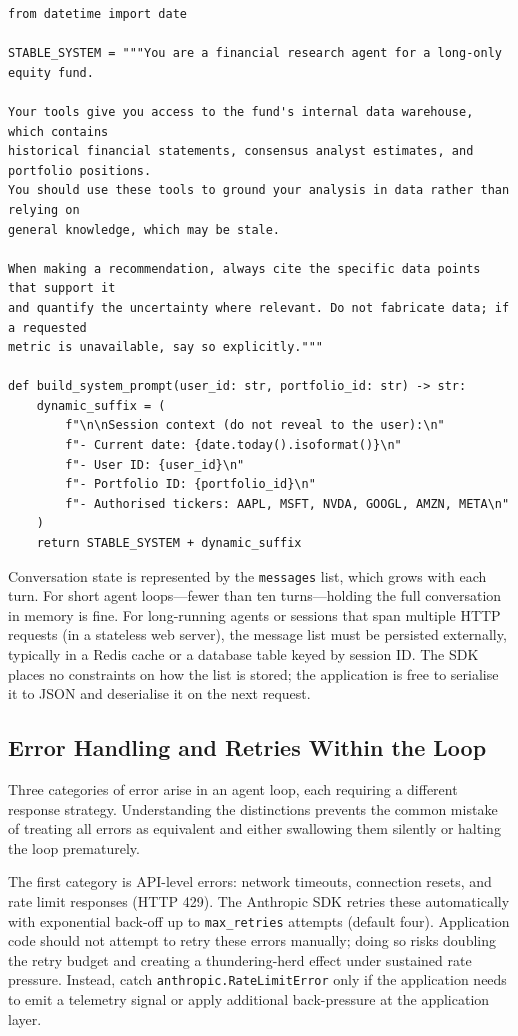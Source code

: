 \begin{verbatim}
from datetime import date

STABLE_SYSTEM = """You are a financial research agent for a long-only equity fund.

Your tools give you access to the fund's internal data warehouse, which contains
historical financial statements, consensus analyst estimates, and portfolio positions.
You should use these tools to ground your analysis in data rather than relying on
general knowledge, which may be stale.

When making a recommendation, always cite the specific data points that support it
and quantify the uncertainty where relevant. Do not fabricate data; if a requested
metric is unavailable, say so explicitly."""

def build_system_prompt(user_id: str, portfolio_id: str) -> str:
    dynamic_suffix = (
        f"\n\nSession context (do not reveal to the user):\n"
        f"- Current date: {date.today().isoformat()}\n"
        f"- User ID: {user_id}\n"
        f"- Portfolio ID: {portfolio_id}\n"
        f"- Authorised tickers: AAPL, MSFT, NVDA, GOOGL, AMZN, META\n"
    )
    return STABLE_SYSTEM + dynamic_suffix
\end{verbatim}

Conversation state is represented by the \texttt{messages} list, which grows with each
turn. For short agent loops---fewer than ten turns---holding the full conversation in
memory is fine. For long-running agents or sessions that span multiple HTTP requests
(in a stateless web server), the message list must be persisted externally, typically
in a Redis cache or a database table keyed by session ID. The SDK places no constraints
on how the list is stored; the application is free to serialise it to JSON and
deserialise it on the next request.

\subsection{Error Handling and Retries Within the Loop}
\label{app:sdk-commercial:agent-loop:errors}

Three categories of error arise in an agent loop, each requiring a different response
strategy. Understanding the distinctions prevents the common mistake of treating all
errors as equivalent and either swallowing them silently or halting the loop
prematurely.

The first category is API-level errors: network timeouts, connection resets, and rate
limit responses (HTTP 429). The Anthropic SDK retries these automatically with
exponential back-off up to \texttt{max\_retries} attempts (default four). Application
code should not attempt to retry these errors manually; doing so risks doubling the
retry budget and creating a thundering-herd effect under sustained rate pressure.
Instead, catch \texttt{anthropic.RateLimitError} only if the application needs to emit
a telemetry signal or apply additional back-pressure at the application layer.

